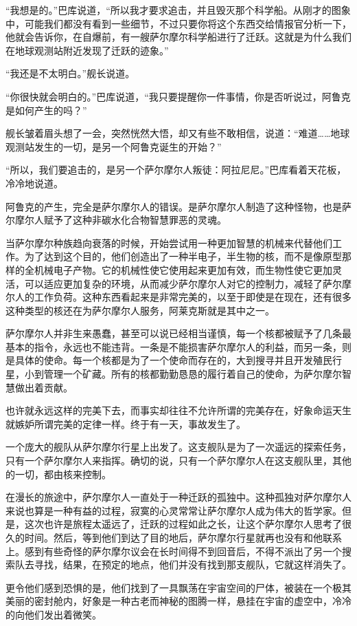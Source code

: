 “我想是的。”巴库说道，“所以我才要求追击，并且毁灭那个科学船。从刚才的图象中，可能我们都没有看到一些细节，不过只要你将这个东西交给情报官分析一下，他就会告诉你，在自爆前，有一艘萨尔摩尔科学船进行了迁跃。这就是为什么我们在地球观测站附近发现了迁跃的迹象。” 

“我还是不太明白。”舰长说道。 

“你很快就会明白的。”巴库说道，“我只要提醒你一件事情，你是否听说过，阿鲁克是如何产生的吗？” 

舰长皱着眉头想了一会，突然恍然大悟，却又有些不敢相信，说道：“难道……地球观测站发生的一切，是另一个阿鲁克诞生的开始？” 

“所以，我们要追击的，是另一个萨尔摩尔人叛徒：阿拉尼尼。”巴库看着天花板，冷冷地说道。 

阿鲁克的产生，完全是萨尔摩尔人的错误。是萨尔摩尔人制造了这种怪物，也是萨尔摩尔人赋予了这种非碳水化合物智慧罪恶的灵魂。 

当萨尔摩尔种族趋向衰落的时候，开始尝试用一种更加智慧的机械来代替他们工作。为了达到这个目的，他们创造出了一种半电子，半生物的核，而不是像原型那样的全机械电子产物。它的机械性使它使用起来更加有效，而生物性使它更加灵活，可以适应更加复杂的环境，从而减少萨尔摩尔人对它的控制力，减轻了萨尔摩尔人的工作负荷。这种东西看起来是非常完美的，以至于即使是在现在，还有很多这种类型的核还在为萨尔摩尔人服务，阿莱克斯就是其中之一。 

萨尔摩尔人并非生来愚蠢，甚至可以说已经相当谨慎，每一个核都被赋予了几条最基本的指令，永远也不能违背。一条是不能损害萨尔摩尔人的利益，而另一条，则是具体的使命。每一个核都是为了一个使命而存在的，大到搜寻并且开发殖民行星，小到管理一个矿藏。所有的核都勤勤恳恳的履行着自己的使命，为萨尔摩尔智慧做出着贡献。 

也许就永远这样的完美下去，而事实却往往不允许所谓的完美存在，好象命运天生就嫉妒所谓完美的定律一样。终于有一天，事故发生了。 

一个庞大的舰队从萨尔摩尔行星上出发了。这支舰队是为了一次遥远的探索任务，只有一个萨尔摩尔人来指挥。确切的说，只有一个萨尔摩尔人在这支舰队里，其他的一切，都由核来控制。 

在漫长的旅途中，萨尔摩尔人一直处于一种迁跃的孤独中。这种孤独对萨尔摩尔人来说也算是一种有益的过程，寂寞的心灵常常让萨尔摩尔人成为伟大的哲学家。但是，这次也许是旅程太遥远了，迁跃的过程如此之长，让这个萨尔摩尔人思考了很久的时间。然后，等到他们到达了目的地后，萨尔摩尔行星就再也没有和他联系上。感到有些奇怪的萨尔摩尔议会在长时间得不到回音后，不得不派出了另一个搜索队去寻找，结果，在预定的地点，他们并没有找到那支舰队，它就这样消失了。 

更令他们感到恐惧的是，他们找到了一具飘荡在宇宙空间的尸体，被装在一个极其美丽的密封舱内，好象是一种古老而神秘的图腾一样，悬挂在宇宙的虚空中，冷冷的向他们发出着微笑。 

